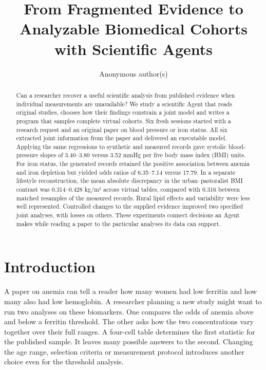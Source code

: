 \documentclass[sigconf,anonymous,nonacm]{acmart}
\begin{document}
\title{From Fragmented Evidence to Analyzable Biomedical Cohorts with Scientific Agents}
\author{Anonymous author(s)}
\begin{abstract}

Can a researcher recover a useful scientific analysis from published evidence when individual measurements are unavailable? We study a scientific Agent that reads original studies, chooses how their findings constrain a joint model and writes a program that samples complete virtual cohorts. Six fresh sessions started with a research request and an original paper on blood pressure or iron status. All six extracted joint information from the paper and delivered an executable model. Applying the same regressions to synthetic and measured records gave systolic blood-pressure slopes of 3.40–\allowbreak{}3.80 versus 3.52 mmHg per five body mass index (BMI) units. For iron status, the generated records retained the positive association between anemia and iron depletion but yielded odds ratios of 6.35–\allowbreak{}7.14 versus 17.79. In a separate lifestyle reconstruction, the mean absolute discrepancy in the urban–\allowbreak{}pastoralist BMI contrast was 0.314–\allowbreak{}0.428 kg/\allowbreak{}m² across virtual tables, compared with 0.316 between matched resamples of the measured records. Rural lipid effects and variability were less well represented. Controlled changes to the supplied evidence improved two specified joint analyses, with losses on others. These experiments connect decisions an Agent makes while reading a paper to the particular analyses its data can support.

\end{abstract}

\maketitle

\section{Introduction}

A paper on anemia can tell a reader how many women had low ferritin and how many also had low hemoglobin. A researcher planning a new study might want to run two analyses on these biomarkers. One compares the odds of anemia above and below a ferritin threshold. The other asks how the two concentrations vary together over their full ranges. A four-cell table determines the first statistic for the published sample. It leaves many possible answers to the second. Changing the age range, selection criteria or measurement protocol introduces another choice even for the threshold analysis.
\end{document}
